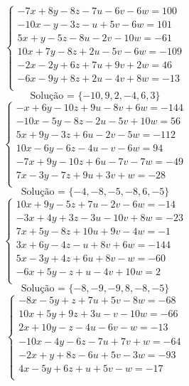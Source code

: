 \documentclass[12pt,oneside,a4paper]{article}
\begin{document}
\vspace{\baselineskip}
\begin{equation*}
\begin{cases}
-7x+8y-8z-7u-6v-6w=100 \\
-10x-y-3z-u+5v-6w=101 \\
5x+y-5z-8u-2v-10w=-61 \\
10x+7y-8z+2u-5v-6w=-109 \\
-2x-2y+6z+7u+9v+2w=46 \\
-6x-9y+8z+2u-4v+8w=-13 \\
\end{cases}
\end{equation*}
\begin{equation*}
\text{Solução = }\{-10,9,2,-4,6,3\}
\end{equation*}
\vspace{\baselineskip}
\begin{equation*}
\begin{cases}
-x+6y-10z+9u-8v+6w=-144 \\
-10x-5y-8z-2u-5v+10w=56 \\
5x+9y-3z+6u-2v-5w=-112 \\
10x-6y-6z-4u-v-6w=94 \\
-7x+9y-10z+6u-7v-7w=-49 \\
7x-3y-7z+9u+3v+w=-28 \\
\end{cases}
\end{equation*}
\begin{equation*}
\text{Solução = }\{-4,-8,-5,-8,6,-5\}
\end{equation*}
\vspace{\baselineskip}
\begin{equation*}
\begin{cases}
10x+9y-5z+7u-2v-6w=-14 \\
-3x+4y+3z-3u-10v+8w=-23 \\
7x+5y-8z+10u+9v-4w=-1 \\
3x+6y-4z-u+8v+6w=-144 \\
5x-3y+4z+6u+8v-w=-60 \\
-6x+5y-z+u-4v+10w=2 \\
\end{cases}
\end{equation*}
\begin{equation*}
\text{Solução = }\{-8,-9,-9,8,-8,-5\}
\end{equation*}
\vspace{\baselineskip}
\begin{equation*}
\begin{cases}
-8x-5y+z+7u+5v-8w=-68 \\
10x+5y+9z+3u-v-10w=-66 \\
2x+10y-z-4u-6v-w=-13 \\
-10x-4y-6z-7u+7v+w=-64 \\
-2x+y+8z-6u+5v-3w=-93 \\
4x-5y+6z+u+5v-w=-17 \\
\end{cases}
\end{equation*}
\end{document}
